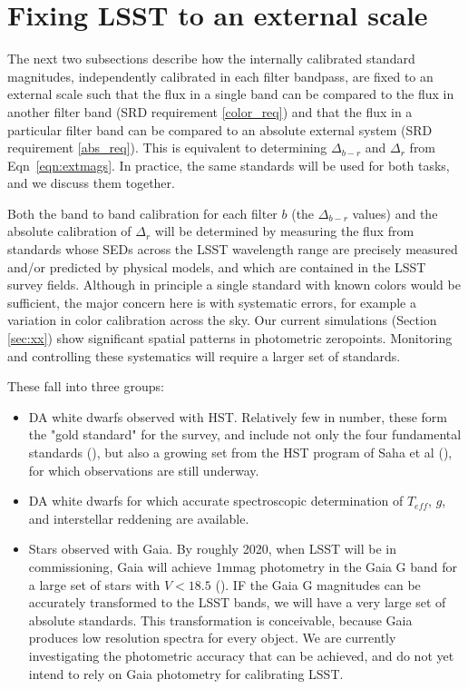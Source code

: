 \documentclass[12pt,preprint]{aastex}
\begin{document}
\section{Fixing LSST to an external scale}
\label{sec:calib_external}

The next two subsections describe how the internally calibrated
standard magnitudes, independently calibrated in each filter bandpass, are fixed
to an external scale such that the flux in a single band can be compared to the
flux in another filter band (SRD requirement \ref{color_req}) and that
the flux in a particular filter band can be compared to an absolute
external system (SRD requirement \ref{abs_req}). This is equivalent to
determining $\Delta_{b-r}$ and $\Delta_r$ from Eqn~\ref{eqn:extmags}. In practice, the same 
standards will be used for both tasks, and we discuss them together.

Both the band to band calibration for each filter $b$ (the $\Delta_{b-r}$
values) and the absolute calibration of $\Delta_r$ will be determined by measuring the flux from standards
whose SEDs across the LSST wavelength range are precisely measured and/or
predicted by physical models, and which are contained in the LSST
survey fields.
Although in principle a single standard with known colors would be
sufficient, the major concern here is with systematic errors, for
example a variation in color calibration across the sky.  Our current simulations (Section \ref{sec:xx})
show significant spatial patterns in photometric zeropoints.  Monitoring
and controlling these
systematics will require a larger set of standards.

These fall into three groups:
\begin{itemize}
\item {DA white dwarfs observed with HST.  Relatively few in number, these form the "gold standard" for the survey,
and include not only the four fundamental standards (\citep{BohlinGilliland}), but also a growing set from
the HST program of Saha et al (\citep{AbiProposal}), for which observations are still underway.}
\item {DA white dwarfs for which accurate spectroscopic determination of $T_{eff}$, $g$, and interstellar
reddening are available.}
\item {Stars observed with Gaia.  By roughly 2020, when LSST will be in commissioning, 
Gaia will achieve 1mmag photometry in the Gaia G band 
for a large set of stars with $V < 18.5$ (\citep{Jordi2010}).  IF the Gaia G magnitudes can be accurately
transformed to the LSST bands, we will have a very large set of absolute standards.  This transformation 
is conceivable, because Gaia produces low resolution spectra for every object.  We are currently
investigating the photometric accuracy that can be achieved, and do not yet intend to rely on Gaia
photometry for calibrating LSST.}
\end{itemize}
\end{document}
